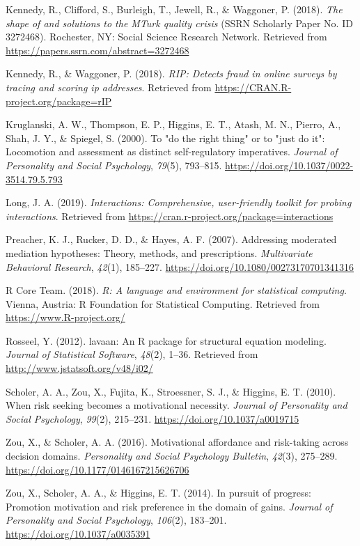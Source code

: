 \documentclass[man,floatsintext]{apa6}
\begin{document}
\leavevmode\hypertarget{ref-kennedyetal2018}{}%
Kennedy, R., Clifford, S., Burleigh, T., Jewell, R., \& Waggoner, P. (2018). \emph{The shape of and solutions to the MTurk quality crisis} (SSRN Scholarly Paper No. ID 3272468). Rochester, NY: Social Science Research Network. Retrieved from \url{https://papers.ssrn.com/abstract=3272468}

\leavevmode\hypertarget{ref-R-rIP}{}%
Kennedy, R., \& Waggoner, P. (2018). \emph{RIP: Detects fraud in online surveys by tracing and scoring ip addresses}. Retrieved from \url{https://CRAN.R-project.org/package=rIP}

\leavevmode\hypertarget{ref-kruglanskietal2000}{}%
Kruglanski, A. W., Thompson, E. P., Higgins, E. T., Atash, M. N., Pierro, A., Shah, J. Y., \& Spiegel, S. (2000). To "do the right thing" or to "just do it": Locomotion and assessment as distinct self-regulatory imperatives. \emph{Journal of Personality and Social Psychology}, \emph{79}(5), 793--815. \url{https://doi.org/10.1037/0022-3514.79.5.793}

\leavevmode\hypertarget{ref-R-interactions}{}%
Long, J. A. (2019). \emph{Interactions: Comprehensive, user-friendly toolkit for probing interactions}. Retrieved from \url{https://cran.r-project.org/package=interactions}

\leavevmode\hypertarget{ref-preacheretal2007}{}%
Preacher, K. J., Rucker, D. D., \& Hayes, A. F. (2007). Addressing moderated mediation hypotheses: Theory, methods, and prescriptions. \emph{Multivariate Behavioral Research}, \emph{42}(1), 185--227. \url{https://doi.org/10.1080/00273170701341316}

\leavevmode\hypertarget{ref-R-base}{}%
R Core Team. (2018). \emph{R: A language and environment for statistical computing}. Vienna, Austria: R Foundation for Statistical Computing. Retrieved from \url{https://www.R-project.org/}

\leavevmode\hypertarget{ref-R-lavaan}{}%
Rosseel, Y. (2012). lavaan: An R package for structural equation modeling. \emph{Journal of Statistical Software}, \emph{48}(2), 1--36. Retrieved from \url{http://www.jstatsoft.org/v48/i02/}

\leavevmode\hypertarget{ref-scholeretal2010}{}%
Scholer, A. A., Zou, X., Fujita, K., Stroessner, S. J., \& Higgins, E. T. (2010). When risk seeking becomes a motivational necessity. \emph{Journal of Personality and Social Psychology}, \emph{99}(2), 215--231. \url{https://doi.org/10.1037/a0019715}

\leavevmode\hypertarget{ref-zouscholer2016}{}%
Zou, X., \& Scholer, A. A. (2016). Motivational affordance and risk-taking across decision domains. \emph{Personality and Social Psychology Bulletin}, \emph{42}(3), 275--289. \url{https://doi.org/10.1177/0146167215626706}

\leavevmode\hypertarget{ref-zouetal2014}{}%
Zou, X., Scholer, A. A., \& Higgins, E. T. (2014). In pursuit of progress: Promotion motivation and risk preference in the domain of gains. \emph{Journal of Personality and Social Psychology}, \emph{106}(2), 183--201. \url{https://doi.org/10.1037/a0035391}

\endgroup
\end{document}
